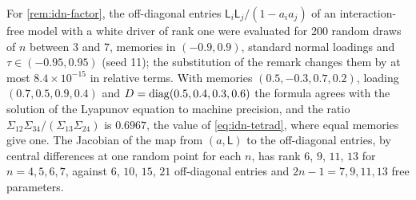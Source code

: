 \begin{numcheck}\label{chk:idn-factor}
For \cref{rem:idn-factor}, the off-diagonal entries $\mathsf L_i\mathsf L_j/(1-a_ia_j)$ of an interaction-free model with a white driver of rank one were evaluated for 200 random draws of $n$ between 3 and 7, memories in $(-0.9,0.9)$, standard normal loadings and $\tau\in(-0.95,0.95)$ (seed 11); the substitution of the remark changes them by at most $8.4\times10^{-15}$ in relative terms. With memories $(0.5,-0.3,0.7,0.2)$, loading $(0.7,0.5,0.9,0.4)$ and $D=\operatorname{diag}(0.5,0.4,0.3,0.6)$ the formula agrees with the solution of the Lyapunov equation to machine precision, and the ratio $\Sigma_{12}\Sigma_{34}/(\Sigma_{13}\Sigma_{24})$ is $0.6967$, the value of \cref{eq:idn-tetrad}, where equal memories give one. The Jacobian of the map from $(a,\mathsf L)$ to the off-diagonal entries, by central differences at one random point for each $n$, has rank $6$, $9$, $11$, $13$ for $n=4,5,6,7$, against $6$, $10$, $15$, $21$ off-diagonal entries and $2n-1=7,9,11,13$ free parameters.
\end{numcheck}

